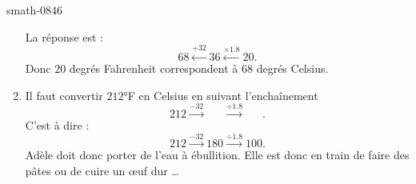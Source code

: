 \begin{corrige}{smath-0846}
\begin{enumerate}
\begin{equation}
            \end{equation}
            La réponse est :
            \begin{equation}
                \boxed{68}\stackrel{+32}{\longleftarrow}\boxed{36}\stackrel{\times 1.8}{\longleftarrow}\boxed{20}.
            \end{equation}
            Donc \( 20\) degrés Fahrenheit correspondent à \( 68\) degrés Celsius.
        \item
            Il faut convertir \( 212\)°F en Celsius en suivant l'enchaînement
            \begin{equation}
                \boxed{212}\stackrel{-32}{\longrightarrow}\boxed{\phantom{301}}\stackrel{\div 1.8}{\longrightarrow}\boxed{ \phantom{301} }.
            \end{equation}
            C'est à dire :
            \begin{equation}
                \boxed{212}\stackrel{-32}{\longrightarrow}\boxed{180}\stackrel{\div 1.8}{\longrightarrow}\boxed{100}.
            \end{equation}
            Adèle doit donc porter de l'eau à ébullition. Elle est donc en train de faire des pâtes ou de cuire un œuf dur \ldots
    \end{enumerate}

\end{corrige}
